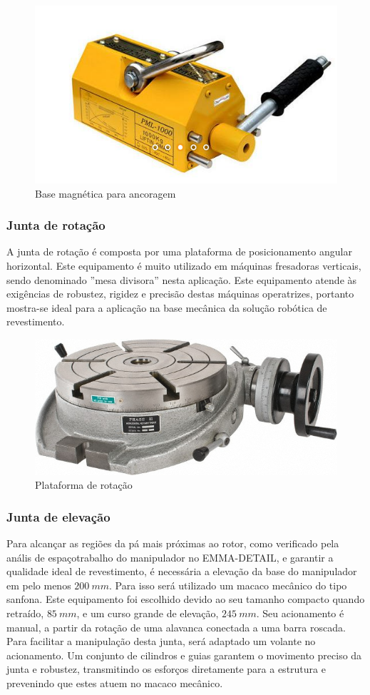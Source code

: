 \begin{figure}[h!]
	\centering
	\includegraphics[width=0.5\columnwidth]{figs/construcao/base_magnetica}
	\caption{Base magnética para ancoragem}
    \label{fig::base_magnetica}
\end{figure}

\subsubsection{Junta de rotação}

A junta de rotação é composta por uma plataforma de posicionamento angular
horizontal. Este equipamento é muito utilizado em máquinas fresadoras
verticais, sendo denominado ''mesa divisora'' nesta aplicação.
Este equipamento atende às exigências de robustez, rigidez e precisão destas
máquinas operatrizes, portanto mostra-se ideal para a aplicação na base mecânica
da solução robótica de revestimento.

\begin{figure}[h!]
	\centering
	\includegraphics[width=0.6\columnwidth]{figs/construcao/rotary_table}
	\caption{Plataforma de rotação}
    \label{fig::rotary_table}
\end{figure}

\subsubsection{Junta de elevação}

Para alcançar as regiões da pá mais próximas ao rotor, como verificado pela
anális de espaçotrabalho do manipulador no EMMA-DETAIL, e garantir a qualidade
ideal de revestimento, é necessária a elevação da base do manipulador em pelo menos $200~mm$.
Para isso será utilizado um macaco mecânico do tipo sanfona. Este equipamento
foi escolhido devido ao seu tamanho compacto quando retraído, $85~mm$, e um
curso grande de elevação, $245~mm$. Seu acionamento é manual, a partir da
rotação de uma alavanca conectada a uma barra roscada.
Para facilitar a manipulação desta junta, será adaptado um volante no
acionamento.
Um conjunto de cilindros e guias garantem o movimento preciso da junta e
robustez, transmitindo os esforços diretamente para a estrutura e prevenindo que
estes atuem no macaco mecânico.

